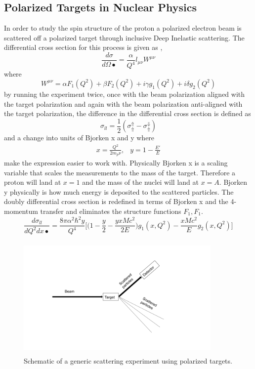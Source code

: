 \documentclass[12pt,notitlepage]{amsart}
\begin{document}
  
  
  \subsection{Polarized Targets in Nuclear Physics}  In order to study the spin structure of the proton a polarized electron beam is scattered off a polarized target through inclusive Deep Inelastic scattering.
  The differential cross section for this process is given as \cite{maxwell,nuke,ellie},
  \begin{equation}
  \frac{d\sigma}{d\Omega•} = \frac{\alpha}{Q^{4}} l_{\mu \nu}W^{\mu \nu}
  \end{equation}
  where 
  \begin{equation}
  W^{\mu \nu} = \alpha F_{1}(Q^{2}) + \beta F_{2}(Q^{2}) + i \gamma g_{1}(Q^{2}) + i \delta g_{2}(Q^{2}) 
  \end{equation}
  by running the experiment twice, once with the beam polarization aligned with the target polarization and again with the beam polarization anti-aligned with the target polarization,
  the difference in the differential cross section is defined as 
     \begin{equation}
   \sigma_{ll} = \frac{1}{2}(\sigma_{\Uparrow}^{\Uparrow} - \sigma_{\Uparrow}^{\Downarrow})
   \end{equation}
  and a change into units of Bjorken x and y where 
  \begin{eqnarray}
  x = \frac{Q^{2}}{2m_{p}\nu} ,&
  y = 1 - \frac{E'}{E}
  \end{eqnarray}
  make the expression easier to work with. Physically Bjorken x is a scaling variable that scales the measurements to the mass of the target. Therefore a proton will land at $x=1$ and the mass of the nuclei will land at $x = A$. Bjorken y physically is how much energy is deposited to the scattered particles. The doubly differential cross section is redefined in terms of Bjorken x and the 4-momentum transfer and eliminates the structure functions $F_{1}, F_{1}$. 
    \begin{equation}
  \frac{d\sigma_{ll}}{dQ^{2}dx•} = \frac{8\pi\alpha^{2}\hbar^{2}y}{Q^{4}} \big[\big(1- \frac{y}{2} - \frac{yxMc^{2}}{2E}\big) g_{1}(x,Q^{2}) - \frac{xMc^{2}}{E}g_{2}(x,Q^{2})\big]
   \end{equation}
  
   
\begin{figure}[h]
\caption{Schematic of a generic scattering experiment using polarized targets.}
\label{scatter}
\centering
\includegraphics[width = 10cm,height = 6cm]{Scattering_exp} 
\end{figure}
\end{document}
